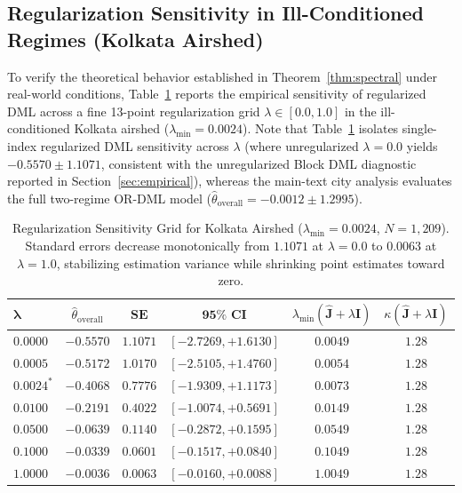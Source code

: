 \documentclass[twoside]{article}
\theoremstyle{definition}
\begin{document}
\subsection{Regularization Sensitivity in Ill-Conditioned Regimes (Kolkata Airshed)}
\label{app:kolkata_sensitivity}
To verify the theoretical behavior established in Theorem~\ref{thm:spectral} under real-world conditions, Table~\ref{tab:kolkata_lambda_grid} reports the empirical sensitivity of regularized DML across a fine 13-point regularization grid $\lambda \in [0.0, 1.0]$ in the ill-conditioned Kolkata airshed ($\lambda_{\min} = 0.0024$). Note that Table~\ref{tab:kolkata_lambda_grid} isolates single-index regularized DML sensitivity across $\lambda$ (where unregularized $\lambda=0.0$ yields $-0.5570 \pm 1.1071$, consistent with the unregularized Block DML diagnostic reported in Section~\ref{sec:empirical}), whereas the main-text city analysis evaluates the full two-regime OR-DML model ($\hat{\theta}_{\mathrm{overall}} = -0.0012 \pm 1.2995$).

\begin{table}[!ht]
\centering
\footnotesize
\renewcommand{\arraystretch}{0.75}
\caption{Regularization Sensitivity Grid for Kolkata Airshed ($\lambda_{\min} = 0.0024$, $N=1,209$). Standard errors decrease monotonically from $1.1071$ at $\lambda=0.0$ to $0.0063$ at $\lambda=1.0$, stabilizing estimation variance while shrinking point estimates toward zero.}
\label{tab:kolkata_lambda_grid}
\begin{tabular}{lccccc}
\toprule
$\boldsymbol{\lambda}$ & $\hat{\theta}_{\mathrm{overall}}$ & $\mathbf{SE}$ & $\mathbf{95\% \text{ CI}}$ & $\lambda_{\min}(\hat{\boldsymbol{J}}+\lambda\boldsymbol{I})$ & $\kappa(\hat{\boldsymbol{J}}+\lambda\boldsymbol{I})$ \\
\midrule
$0.0000$ & $-0.5570$ & $1.1071$ & $[-2.7269, +1.6130]$ & $0.0049$ & $1.28$ \\
$0.0005$ & $-0.5172$ & $1.0170$ & $[-2.5105, +1.4760]$ & $0.0054$ & $1.28$ \\
$0.0024^*$ & $-0.4068$ & $0.7776$ & $[-1.9309, +1.1173]$ & $0.0073$ & $1.28$ \\
$0.0100$ & $-0.2191$ & $0.4022$ & $[-1.0074, +0.5691]$ & $0.0149$ & $1.28$ \\
$0.0500$ & $-0.0639$ & $0.1140$ & $[-0.2872, +0.1595]$ & $0.0549$ & $1.28$ \\
$0.1000$ & $-0.0339$ & $0.0601$ & $[-0.1517, +0.0840]$ & $0.1049$ & $1.28$ \\
$1.0000$ & $-0.0036$ & $0.0063$ & $[-0.0160, +0.0088]$ & $1.0049$ & $1.28$ \\
\bottomrule
\end{tabular}
\end{table}
\end{document}
